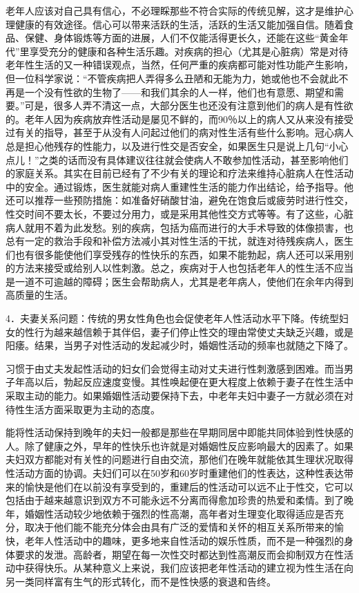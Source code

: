 \documentclass[12pt,UTF8]{ctexbook}
\begin{document}
老年人应该对自己具有信心，不必理睬那些不符合实际的传统见解，这才是维护心理健康的有效途径。信心可以带来活跃的生活，活跃的生活又能加强自信。随着食品、保健、身体锻炼等方面的进展，人们不仅能活得更长久，还能在这些“黄金年代”里享受充分的健康和各种生活乐趣。对疾病的担心（尤其是心脏病）常是对待老年性生活的又一种错误观点，当然，任何严重的疾病都可能对性功能产生影响，但一位科学家说：“不管疾病把人弄得多么丑陋和无能为力，她或他也不会就此不再是一个没有性欲的生物了——和我们其余的人一样，他们也有意愿、期望和需要。”可是，很多人弄不清这一点，大部分医生也还没有注意到他们的病人是有性欲的。老年人因为疾病放弃性活动是屡见不鲜的，而90％以上的病人又从来没有接受过有关的指导，甚至于从没有人问起过他们的病对性生活有些什么影响。冠心病人总是担心他残存的性能力，以及进行性交是否安全，如果医生只是说上几句“小心点儿！”之类的话而没有具体建议往往就会使病人不敢参加性活动，甚至影响他们的家庭关系。其实在目前已经有了不少有关的理论和疗法来维持心脏病人在性活动中的安全。通过锻炼，医生就能对病人重建性生活的能力作出结论，给予指导。他还可以推荐一些预防措施：如准备好硝酸甘油，避免在饱食后或疲劳时进行性交，性交时间不要太长，不要过分用力，或是采用其他性交方式等等。有了这些，心脏病人就用不着为此发愁。别的疾病，包括为癌而进行的大手术导致的体像损害，也总有一定的救治手段和补偿方法减小其对性生活的干扰，就连对待残疾病人，医生们也有很多能使他们享受残存的性快乐的东西，如果不能勃起，病人还可以采用别的方法来接受或给别人以性刺激。总之，疾病对于人也包括老年人的性生活不应当是一道不可逾越的障碍；医生会帮助病人，尤其是老年病人，使他们在余年内得到高质量的生活。

4．夫妻关系问题：传统的男女性角色也会促使老年人性活动水平下降。传统型妇女的性行为越来越信赖于其伴侣，妻子们停止性交的理由常使丈夫缺乏兴趣，或是阳痿。结果，当男子对性活动的发起减少时，婚姻性活动的频率也就随之下降了。

习惯于由丈夫发起性活动的妇女们会觉得主动对丈夫进行性刺激感到困难。而当男子年高以后，勃起反应速度变慢。其性唤起便在更大程度上依赖于妻子在性生活中采取主动的能力。如果婚姻性活动要保持下去，中老年夫妇中妻子一方就必须在对待性生活方面采取更为主动的态度。

能将性活动保持到晚年的夫妇一般都是那些在早期同居中即能共同体验到性快感的人。除了健康之外，早年的性快乐也许就是对婚姻性反应影响最大的因素了。如果夫妇双方都能对有关性的问题进行自由交流，那他们在晚年就能依其生理状况取得性活动方面的协调。夫妇们可以在50岁和60岁时重建他们的性表达，这种性表达带来的愉快是他们在以前没有享受到的，重建后的性活动可以远不止于性交，它可以包括由于越来越意识到双方不可能永远不分离而得愈加珍贵的热爱和柔情。到了晚年，婚姻性活动较少地依赖于强烈的性高潮，高年者对生理变化取得适应是否充分，取决于他们能不能充分体会由具有广泛的爱情和关怀的相互关系所带来的愉快，老年人性活动中的趣味，更多地来自性活动的娱乐性质，而不是一种强烈的身体要求的发泄。高龄者，期望在每一次性交时都达到性高潮反而会抑制双方在性活动中获得快乐。从某种意义上来说，我们应该把老年性活动的建立视为性生活在向另一类同样富有生气的形式转化，而不是性快感的衰退和告终。
\end{document}
